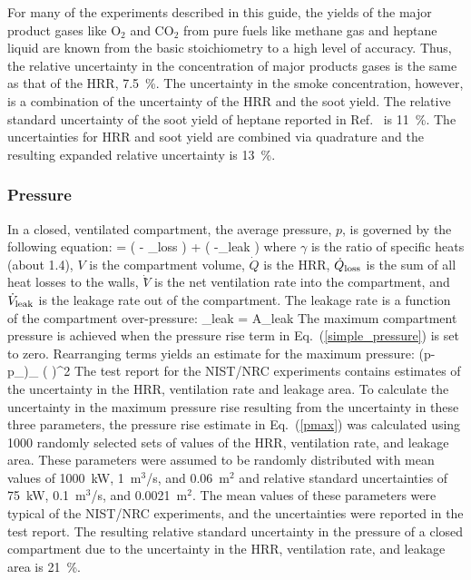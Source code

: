 For many of the experiments described in this guide, the yields of the major product gases like O$_2$ and CO$_2$ from pure fuels like methane gas and heptane liquid are known from the basic stoichiometry to a high level of accuracy. Thus, the relative uncertainty in the concentration of major products gases is the same as that of the HRR, 7.5~\%. The uncertainty in the smoke concentration, however, is a combination of the uncertainty of the HRR and the soot yield. The relative standard uncertainty of the soot yield of heptane reported in Ref.~\cite{Hamins:SP1013-1} is 11~\%. The uncertainties for HRR and soot yield are combined via quadrature and the resulting expanded relative uncertainty is 13~\%.

\subsubsection{Pressure}

In a closed, ventilated compartment, the average pressure, $p$, is governed by the following equation:
\be
    =  \left(  - _{\rm loss} \right) +  \left( -_{\rm leak} \right) \label{simple_pressure}
\ee
where $\gamma$ is the ratio of specific heats (about 1.4), $V$ is the compartment volume, $\dot{Q}$ is the HRR, $\dot{Q}_{\rm loss}$  is the sum of all heat losses to the walls, $\dot{V}$̇ is the net ventilation rate into the compartment, and $\dot{V}_{\rm leak}$  is the leakage rate out of the compartment. The leakage rate is a function of the compartment over-pressure:
\be
   _{\rm leak} = A_{\rm leak} 
\ee
The maximum compartment pressure is achieved when the pressure rise term in Eq.~(\ref{simple_pressure}) is set to zero. Rearranging terms yields an estimate for the maximum pressure:
\be
   (p-p_\infty)_{\max} \approx {} \left(  \right)^2 \label{pmax}
\ee
The test report for the NIST/NRC experiments contains estimates of the uncertainty in the HRR, ventilation rate and leakage area. To calculate the uncertainty in the maximum pressure rise resulting from the uncertainty in these three parameters, the pressure rise estimate in Eq.~(\ref{pmax}) was calculated using 1000 randomly selected sets of values of the HRR, ventilation rate, and leakage area. These parameters were assumed to be randomly distributed with mean values of 1000~kW, 1~m$^3$/s, and 0.06~m$^2$ and relative standard uncertainties of 75~kW, 0.1~m$^3$/s, and 0.0021~m$^2$. The mean values of these parameters were typical of the NIST/NRC experiments, and the uncertainties were reported in the test report. The resulting relative standard uncertainty in the pressure of a closed compartment due to the uncertainty in the HRR, ventilation rate, and leakage area is 21~\%.

